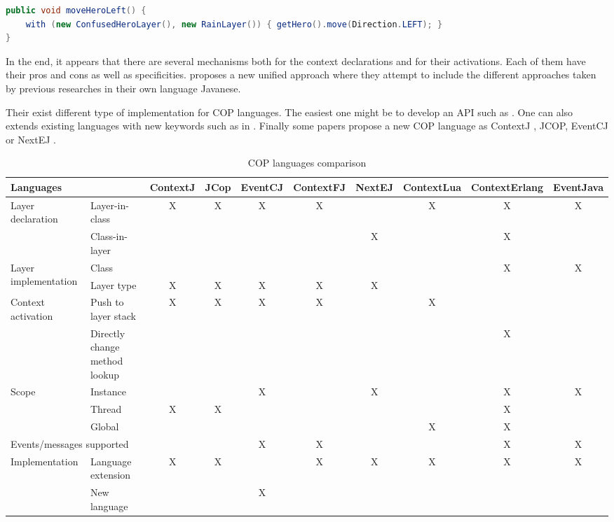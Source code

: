 \documentclass[a4paper]{article}
\begin{document}
\begin{lstlisting}[float, language=Java, caption=JCop layer activation example, label={listing:jcopwith}]
public void moveHeroLeft() {
	with (new ConfusedHeroLayer(), new RainLayer()) { getHero().move(Direction.LEFT); }
}
\end{lstlisting}


In the end, it appears that there are several mechanisms both for the context declarations and for their activations. Each of them have their pros and cons as well as specificities. \cite{kamina_unified_2013} proposes a new unified approach where they attempt to include the different approaches taken by previous researches in their own language Javanese.

Their exist different type of implementation for COP languages. The easiest one might be to develop an API such as \cite{appeltauer_dedicated_2008}. One can also extends existing languages with new keywords such as in \cite{clarke_semantics_2009} \cite{ghezzi_context_2010}. Finally some papers propose a new COP language as ContextJ \cite{haupt_contextj:_2011}, JCOP\cite{appeltauer_declarative_2013}, EventCJ \cite{kamina_eventcj:_2011} or NextEJ \cite{kamina_towards_2009}.

\begin{landscape}
  \begin{table}
  \renewcommand{\arraystretch}{1.2}
  \begin{tabular}{l p{3cm} c c c c c c c c }
  \hline
  \multicolumn{2}{l}{Languages} & ContextJ & JCop & EventCJ & ContextFJ & NextEJ & ContextLua & ContextErlang & EventJava \\
  \hline
  \multirow{2}{*}{Layer declaration} & Layer-in-class & X & X & X & X & & X & X & X \\
    & Class-in-layer & & & & & X & & X & \\
  \hline
  \multirow{2}{*}{Layer implementation} & Class & & & & & & & X & X \\
    & Layer type & X & X & X & X & X & & & \\    
  \hline  
  \multirow{2}{*}{Context activation} & Push to layer stack & X & X & X & X & & X & \\
    & Directly change method lookup & & & & & & & X \\
  \hline  
  \multirow{3}{*}{Scope} & Instance & & & X & & X & & X & X \\
    & Thread & X & X & & & & & X \\
    & Global & & & & & & X & X \\
  \hline
  \multicolumn{2}{l}{\multirow{1}{*}{Events/messages supported}} & & & X & X & & & X & X \\
  \hline
  \multirow{3}{*}{Implementation} & Language extension & X & X & & X & X & X & X & X \\
    & New language & & & X & & & & & \\
  \end{tabular}
  \caption{COP languages comparison}
  \end{table}
\end{landscape}
\end{document}
